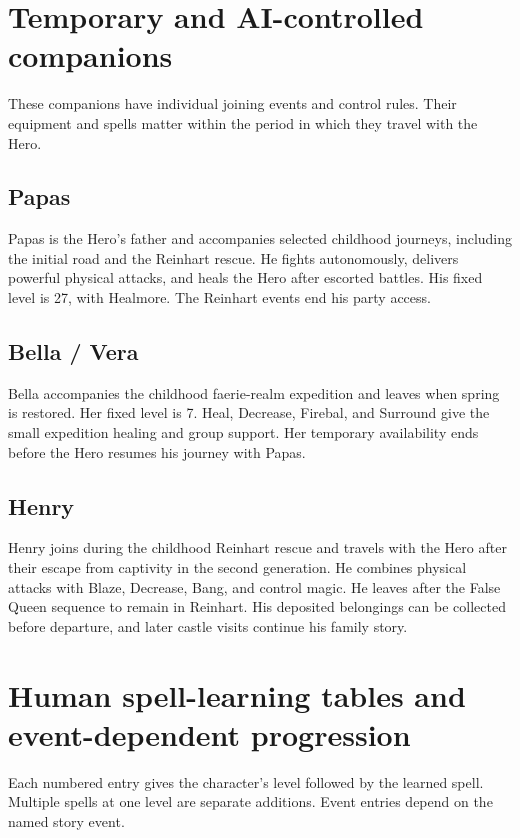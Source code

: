 \section{Temporary and AI-controlled companions}
These companions have individual joining events and control rules. Their
equipment and spells matter within the period in which they travel with the Hero.

\subsection{Papas}
Papas is the Hero's father and accompanies selected childhood journeys,
including the initial road and the Reinhart rescue. He fights autonomously,
delivers powerful physical attacks, and heals the Hero after escorted battles.
His fixed level is 27, with Healmore. The Reinhart events end his party access.

\subsection{Bella / Vera}
Bella accompanies the childhood faerie-realm expedition and leaves when spring
is restored. Her fixed level is 7. Heal, Decrease, Firebal, and Surround give
the small expedition healing and group support. Her temporary availability
ends before the Hero resumes his journey with Papas.

\subsection{Henry}
Henry joins during the childhood Reinhart rescue and travels with the Hero
after their escape from captivity in the second generation. He combines
physical attacks with Blaze, Decrease, Bang, and control magic. He leaves after
the False Queen sequence to remain in Reinhart. His deposited belongings can
be collected before departure, and later castle visits continue his family story.

\section{Human spell-learning tables and event-dependent progression}
Each numbered entry gives the character's level followed by the learned spell.
Multiple spells at one level are separate additions. Event entries depend on
the named story event.

